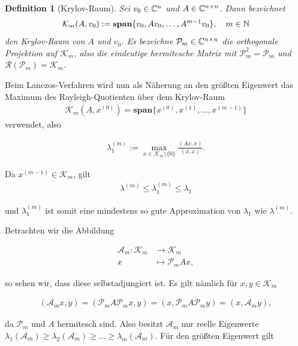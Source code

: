 \documentclass{article}
\theoremstyle{plain}
\newtheorem{definition} [theorem]{Definition}
\begin{document}
\begin{definition}[Krylov-Raum]
	Sei $v_0 \in \mathbb{C}^{n}$ und $A \in \mathbb{C}^{n \times n}$. Dann bezeichnet
	\begin{align*}
		\mathcal{K}_m(A,v_0) := \textbf{span}\{v_0, Av_0, \dots, A^{m-1}v_0\}, \quad m \in \mathbb{N}
	\end{align*}
	den Krylov-Raum von $A$ und $v_0$. Es bezeichne $\mathcal{P}_m \in \mathbb{C}^{n \times n}$ die orthogonale Projektion auf $\mathcal{K}_m$, also die eindeutige hermitesche Matrix mit $\mathcal{P}_m^2 = \mathcal{P}_m$ und $\mathcal{R}(\mathcal{P}_m) = \mathcal{K}_m$.
\end{definition}

Beim Lanczos-Verfahren wird nun als Näherung an den größten Eigenwert das Maximum des Rayleigh-Quotienten über dem Krylov-Raum
\begin{align*}
	\mathcal{K}_m(A,x^{(0)}) = \textbf{span}\{x^{(0)}, x^{(1)}, \dots , x^{(m-1)} \}
\end{align*}
verwendet, also

\begin{align*}
	\lambda_1^{(m)} := \max_{x \in \mathcal{K}_m \setminus \{0\}} \frac{(Ax,x)}{(x,x)}.
\end{align*}

Da $x^{(m-1)} \in \mathcal{K}_m$, gilt
\begin{align*}
	\lambda^{(m)} \leq \lambda_1^{(m)} \leq \lambda_1
\end{align*}

und $\lambda_1^{(m)}$ ist somit eine mindestens so gute Approximation von $\lambda_1$ wie $\lambda^{(m)}$.

Betrachten wir die Abbildung

\begin{align*}
	\mathcal{A}_m: \mathcal{K}_m &\to \mathcal{K}_m \\
	x &\mapsto \mathcal{P}_m Ax,
\end{align*}

so sehen wir, dass diese selbstadjungiert ist. Es gilt nämlich für $x,y \in \mathcal{K}_m$

\begin{align*}
	(\mathcal{A}_mx, y) = (\mathcal{P}_m A \mathcal{P}_m x, y) = (x, \mathcal{P}_m A \mathcal{P}_m y) = (x, \mathcal{A}_m y),
\end{align*}

da $\mathcal{P}_m$ und $A$ hermitesch sind. Also besitzt $ \mathcal{A}_m$ nur reelle Eigenwerte $\lambda_1(\mathcal{A}_m) \geq \lambda_2(\mathcal{A}_m) \geq \dots \geq \lambda_m(\mathcal{A}_m)$. Für den größten Eigenwert gilt
\end{document}
